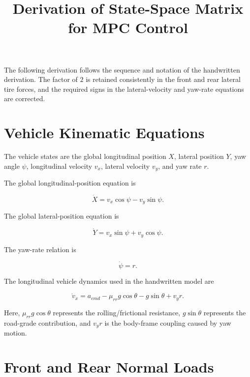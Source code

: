\documentclass[12pt,a4paper]{article}
\title{\textbf{Derivation of State-Space Matrix for MPC Control}}
\author{}
\date{}
\begin{document}
\maketitle

The following derivation follows the sequence and notation of the
handwritten derivation. The factor of $2$ is retained consistently in
the front and rear lateral tire forces, and the required signs in the
lateral-velocity and yaw-rate equations are corrected.

\section{Vehicle Kinematic Equations}

The vehicle states are the global longitudinal position $X$, lateral
position $Y$, yaw angle $\psi$, longitudinal velocity $v_x$, lateral
velocity $v_y$, and yaw rate $r$.

The global longitudinal-position equation is

\begin{equation}
\boxed{
\dot X=v_x\cos\psi-v_y\sin\psi
}.
\end{equation}

The global lateral-position equation is

\begin{equation}
\boxed{
\dot Y=v_x\sin\psi+v_y\cos\psi
}.
\end{equation}

The yaw-rate relation is

\begin{equation}
\boxed{
\dot\psi=r
}.
\end{equation}

The longitudinal vehicle dynamics used in the handwritten model are

\begin{equation}
\boxed{
\dot v_x
=
a_{cmd}
-\mu_{rr}g\cos\theta
-g\sin\theta
+v_yr
}.
\end{equation}

Here, $\mu_{rr}g\cos\theta$ represents the rolling/frictional resistance,
$g\sin\theta$ represents the road-grade contribution, and $v_yr$ is the
body-frame coupling caused by yaw motion.

\section{Front and Rear Normal Loads}
\end{document}
